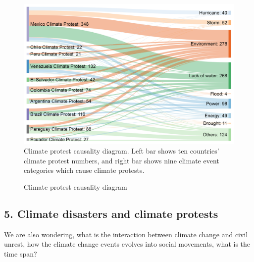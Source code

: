 \documentclass[9pt,twocolumn,twoside]{pnas-new}
\begin{document}
\begin{figure}[ht]
\centerline
{\includegraphics[width=.4\textwidth]{figures/causality1}}
\caption{Climate protest causality diagram. Left bar shows ten countries' climate protest numbers, and right bar shows nine climate event categories which cause climate protests.}
\label{causality}
\end{figure}


\begin{figure}[ht]
	\centering
	\caption{Climate protest causality diagram}
\label{three-causality}
\end{figure}



\subsection{5. Climate disasters and climate protests}
We are also wondering, what is the interaction between climate change and civil unrest, how the climate change events evolves into social movements, what is the time span?
\end{document}
